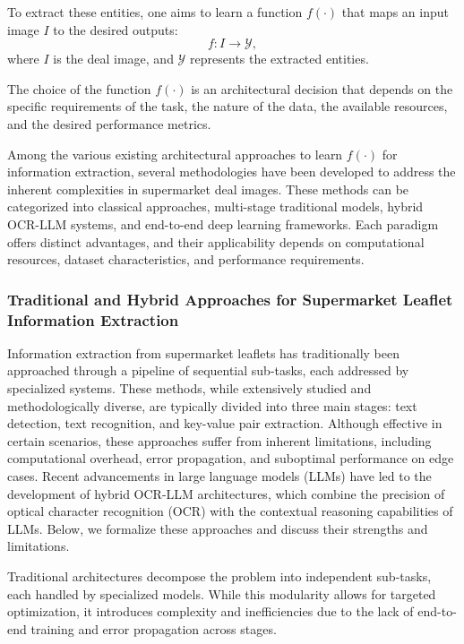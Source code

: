 \documentclass[11pt]{article}
\begin{document}
To extract these entities, one aims to learn a function $f(\cdot)$ that maps an input image $I$ to the desired outputs:
\begin{equation}
    f: I \to \mathcal{Y},
\end{equation}
where $ I $ is the deal image, and $ \mathcal{Y} $ represents the extracted entities.

The choice of the function $ f(\cdot) $ is an architectural decision that depends on the specific requirements of the task, the nature of the data, the available resources, and the desired performance metrics. 

Among the various existing architectural approaches to learn $ f(\cdot) $ for information extraction, several methodologies have been developed to address the inherent complexities in supermarket deal images. These methods can be categorized into classical approaches, multi-stage traditional models, hybrid OCR-LLM systems, and end-to-end deep learning frameworks. Each paradigm offers distinct advantages, and their applicability depends on computational resources, dataset characteristics, and performance requirements.

\subsubsection{Traditional and Hybrid Approaches for Supermarket Leaflet Information Extraction}  
Information extraction from supermarket leaflets has traditionally been approached through a pipeline of sequential sub-tasks, each addressed by specialized systems. These methods, while extensively studied and methodologically diverse, are typically divided into three main stages: text detection, text recognition, and key-value pair extraction. Although effective in certain scenarios, these approaches suffer from inherent limitations, including computational overhead, error propagation, and suboptimal performance on edge cases. Recent advancements in large language models (LLMs) have led to the development of hybrid OCR-LLM architectures, which combine the precision of optical character recognition (OCR) with the contextual reasoning capabilities of LLMs. Below, we formalize these approaches and discuss their strengths and limitations.

Traditional architectures decompose the problem into independent sub-tasks, each handled by specialized models. While this modularity allows for targeted optimization, it introduces complexity and inefficiencies due to the lack of end-to-end training and error propagation across stages.
\end{document}
